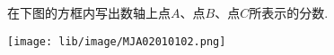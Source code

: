 在下图的方框内写出数轴上点$A$、点$B$、点$C$所表示的分数.
\begin{center}
\texttt{[image: lib/image/MJA02010102.png]}
\end{center}